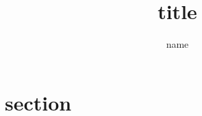 \documentclass{article}
\begin{document}
\title{title}
\author{name}
\maketitle
{}\baselineskip

\section{section}
\ \\
\end{document}
